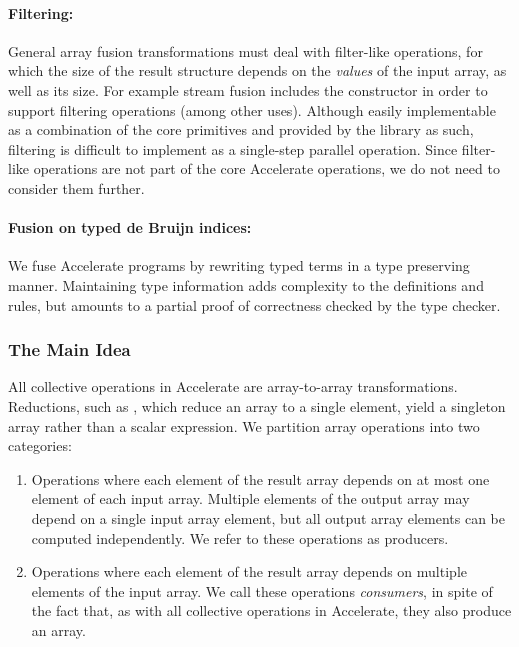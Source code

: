 \paragraph{Filtering:} General array fusion transformations must deal with
filter-like operations, for which the size of the result structure depends on
the \emph{values} of the input array, as well as its size. For example
stream fusion includes the  constructor in
order to support filtering operations (among other uses). Although easily
implementable as a combination of the core primitives and provided by the
library as such, filtering is difficult to implement as a single-step parallel
operation. Since filter-like operations are not part of the core Accelerate
operations, we do not need to consider them further.

%

\paragraph{Fusion on typed de Bruijn indices:} We fuse Accelerate programs by
rewriting typed  terms in a type preserving manner.
Maintaining type information adds complexity to the definitions and rules, but
amounts to a partial proof of correctness checked by the type checker.


\subsubsection{The Main Idea}
\label{sec:the_main_idea}

All collective operations in Accelerate are array-to-array transformations.
Reductions, such as , which reduce an array to a single element,
yield a singleton array rather than a scalar expression. We partition array
operations into two categories:

\begin{enumerate}
    \item Operations where each element of the result array depends on at most
        one element of each input array. Multiple elements of the output array
        may depend on a single input array element, but all output array
        elements can be computed independently. We refer to these operations as
        producers.

    \item Operations where each element of the result array depends on multiple
        elements of the input array. We call these operations
        \emph{consumers}, in spite of the fact that, as with all
        collective operations in Accelerate, they also produce an array.
\end{enumerate}

